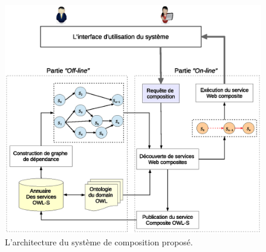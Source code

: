 \begin{figure}[h]
    \centering
    \includegraphics[width=1.15\textwidth]{figs/ch3/architecture.eps}
    \caption{L'architecture du système de composition proposé.}
    \label{fig:ch3/architecture}
\end{figure}
